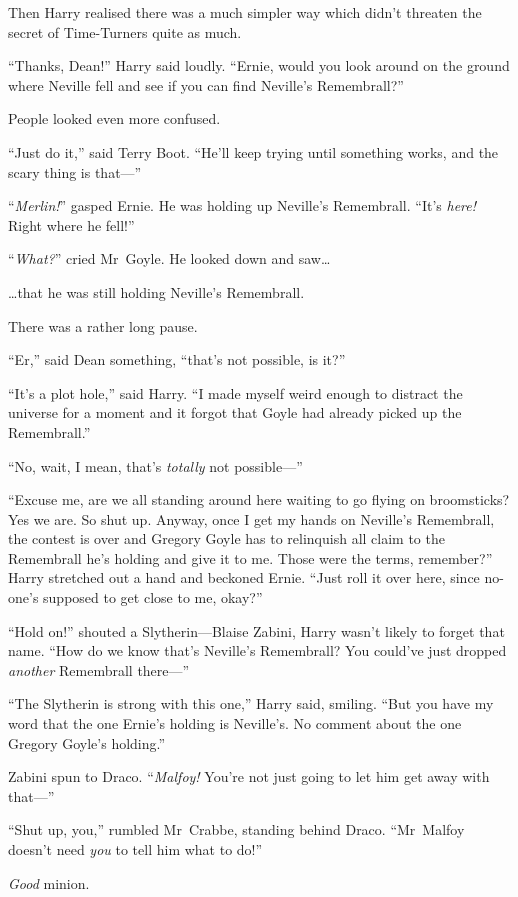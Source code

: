 Then Harry realised there was a much simpler way which didn’t threaten the secret of Time-Turners quite as much.

“Thanks, Dean!” Harry said loudly. “Ernie, would you look around on the ground where Neville fell and see if you can find Neville’s Remembrall?”

People looked even more confused.

“Just do it,” said Terry Boot. “He’ll keep trying until something works, and the scary thing is that—”

“\emph{Merlin!}” gasped Ernie. He was holding up Neville’s Remembrall. “It’s \emph{here!} Right where he fell!”

“\emph{What?}” cried Mr~Goyle. He looked down and saw…

…that he was still holding Neville’s Remembrall.

There was a rather long pause.

“Er,” said Dean something, “that’s not possible, is it?”

“It’s a plot hole,” said Harry. “I made myself weird enough to distract the universe for a moment and it forgot that Goyle had already picked up the Remembrall.”

“No, wait, I mean, that’s \emph{totally} not possible—”

“Excuse me, are we all standing around here waiting to go flying on broomsticks? Yes we are. So shut up. Anyway, once I get my hands on Neville’s Remembrall, the contest is over and Gregory Goyle has to relinquish all claim to the Remembrall he’s holding and give it to me. Those were the terms, remember?” Harry stretched out a hand and beckoned Ernie. “Just roll it over here, since no-one’s supposed to get close to me, okay?”

“Hold on!” shouted a Slytherin—Blaise Zabini, Harry wasn’t likely to forget that name. “How do we know that’s Neville’s Remembrall? You could’ve just dropped \emph{another} Remembrall there—”

“The Slytherin is strong with this one,” Harry said, smiling. “But you have my word that the one Ernie’s holding is Neville’s. No comment about the one Gregory Goyle’s holding.”

Zabini spun to Draco. “\emph{Malfoy!} You’re not just going to let him get away with that—”

“Shut up, you,” rumbled Mr~Crabbe, standing behind Draco. “Mr~Malfoy doesn’t need \emph{you} to tell him what to do!”

\emph{Good} minion.

